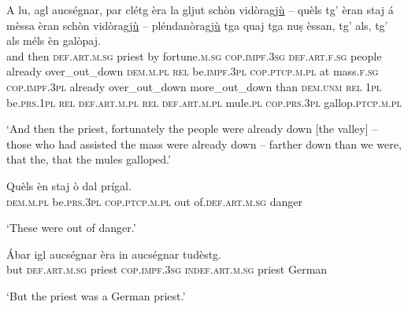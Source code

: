 \begin{linenumbers}
\gll   A lu, agl aucségnar, par clétg èra la gljut schòn vidòragj\underline{ù} – quèls tg’ èran staj á mèssa èran schòn vidòragj\underline{ù} – pléndanòragj\underline{ù} tga quaj tga nuṣ èssan, tg’ als, tg’ als méls èn galòpaj.  \\
and then \textsc{def.art.m.sg} priest by fortune.\textsc{m.sg} \textsc{cop.impf.3sg} \textsc{def.art.f.sg} people already over\_out\_down {} \textsc{dem.m.pl} \textsc{rel} be.\textsc{impf.3pl} \textsc{cop.ptcp.m.pl} at mass.\textsc{f.sg} \textsc{cop.impf.3pl} already over\_out\_down {} more\_out\_down than \textsc{dem.unm} \textsc{rel} \textsc{1pl} be.\textsc{prs.1pl} \textsc{rel} \textsc{def.art.m.pl} \textsc{rel} \textsc{def.art.m.pl} mule.\textsc{pl} \textsc{cop.prs.3pl} gallop.\textsc{ptcp.m.pl}\\
\end{linenumbers}
\medskip
\glt `And then the priest, fortunately the people were already down [the valley] – those who had assisted the mass were already down – farther down than we were, that the, that the mules galloped.'
\medskip

\begin{linenumbers}
\gll   Quèls èn staj ò dal prígal. \\
 \textsc{dem.m.pl} be.\textsc{prs.3pl} \textsc{cop.ptcp.m.pl} out of.\textsc{def.art.m.sg} danger\\
\end{linenumbers}
\medskip
\glt `These were out of danger.'
\medskip

\begin{linenumbers}
\gll   Ábar igl aucségnar èra in aucségnar tudèstg.\\
but \textsc{def.art.m.sg} priest \textsc{cop.impf.3sg} \textsc{indef.art.m.sg} priest German \\
\end{linenumbers}
\medskip
\glt `But the priest was a German priest.'
\medskip

